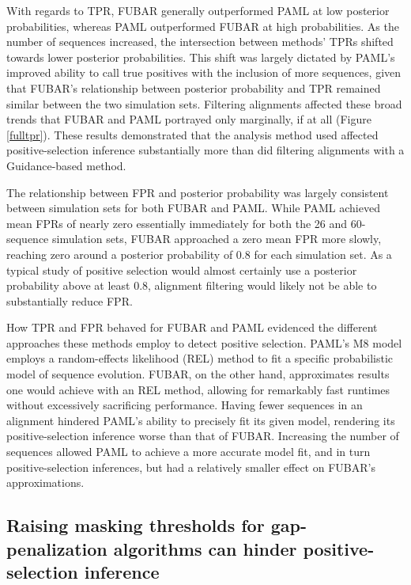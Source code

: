 \documentclass[11pt]{article}
\begin{document}
With regards to TPR, FUBAR generally outperformed PAML at low posterior probabilities, whereas PAML outperformed FUBAR at high probabilities. As the number of sequences increased, the intersection between methods' TPRs shifted towards lower posterior probabilities. This shift was largely dictated by PAML's improved ability to call true positives with the inclusion of more sequences, given that FUBAR's relationship between posterior probability and TPR remained similar between the two simulation sets.  Filtering alignments affected these broad trends that FUBAR and PAML portrayed only marginally, if at all (Figure \ref{fulltpr}). These results demonstrated that the analysis method used affected positive-selection inference substantially more than did filtering alignments with a Guidance-based method. 

The relationship between FPR and posterior probability was largely consistent between simulation sets for both FUBAR and PAML. While PAML achieved mean FPRs of nearly zero essentially immediately for both the 26 and 60-sequence simulation sets, FUBAR approached a zero mean FPR more slowly, reaching zero around a posterior probability of 0.8 for each simulation set. As a typical study of positive selection would almost certainly use a posterior probability above at least 0.8, alignment filtering would likely not be able to substantially reduce FPR.

How TPR and FPR behaved for FUBAR and PAML evidenced the different approaches these methods employ to detect positive selection. PAML's M8 model employs a random-effects likelihood (REL) method \citep{NielsenYang1998} to fit a specific probabilistic model of sequence evolution. FUBAR, on the other hand, approximates results one would achieve with an REL method, allowing for remarkably fast runtimes without excessively sacrificing performance. Having fewer sequences in an alignment hindered PAML's ability to precisely fit its given model, rendering its positive-selection inference worse than that of FUBAR. Increasing the number of sequences allowed PAML to achieve a more accurate model fit, and in turn positive-selection inferences, but had a relatively smaller effect on FUBAR's approximations.

\subsection*{Raising masking thresholds for gap-penalization algorithms can hinder positive-selection inference}
\end{document}
